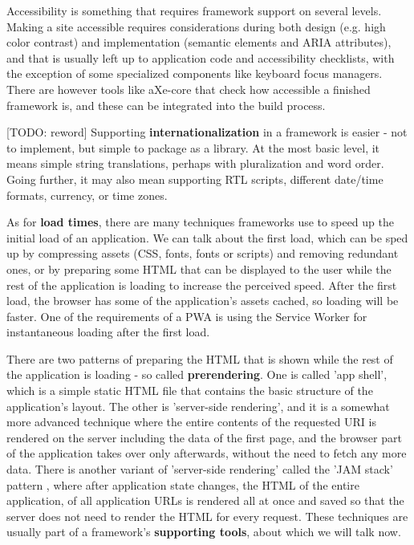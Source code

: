 \documentclass[english,odsaz]{fitthesis}
\begin{document}
Accessibility is something that requires framework support on several
levels. Making a site accessible requires considerations during both design
(e.g. high color contrast) and implementation (semantic elements and ARIA
attributes), and that is usually left up to application code and accessibility
checklists, with the exception of some specialized components like keyboard
focus managers. There are however tools like aXe-core that check how accessible
a finished framework is, and these can be integrated into the build process.

[TODO: reword] Supporting \textbf{internationalization} in a framework is easier - not to implement, but
simple to package as a library. At the most basic level, it means simple string
translations, perhaps with pluralization and word order. Going further, it may
also mean supporting RTL scripts, different date/time formats, currency, or time
zones.

As for \textbf{load times}, there are many techniques frameworks use to speed up the
initial load of an application. We can talk about the first load, which can be
sped up by compressing assets (CSS, fonts, fonts or scripts) and removing
redundant ones, or by preparing some HTML that can be displayed to the user
while the rest of the application is loading to increase the perceived
speed. After the first load, the browser has some of the application's assets
cached, so loading will be faster. One of the requirements of a PWA is using the
Service Worker for instantaneous loading after the first load.

There are two patterns of preparing the HTML that is shown while the rest of the
application is loading - so called \textbf{prerendering}. One is called 'app shell',
which is a simple static HTML file that contains the basic structure of the
application's layout. The other is 'server-side rendering', and it is a somewhat
more advanced technique where the entire contents of the requested URI is
rendered on the server including the data of the first page, and the browser
part of the application takes over only afterwards, without the need to fetch
any more data. There is another variant of 'server-side rendering' called the
'JAM stack' pattern \cite{jamstack}, where after application state changes, the
HTML of the entire application, of all application URLs is rendered all at once
and saved so that the server does not need to render the HTML for every
request. These techniques are usually part of a framework's \textbf{supporting tools},
about which we will talk now.
\end{document}
